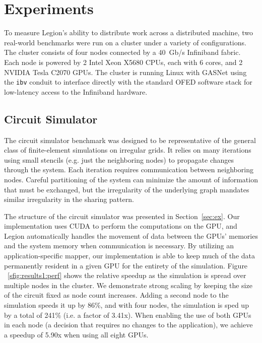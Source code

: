 \section{Experiments}
\label{sec:exp}

To measure Legion's ability to distribute work across a distributed machine, 
two real-world benchmarks were run on a cluster under a
variety of configurations.  The cluster consists of four nodes connected by a
40~Gb/s Infiniband fabric.  Each node is powered by 2 Intel Xeon X5680 CPUs,
each with 6 cores, and 2 NVIDIA Tesla C2070 GPUs.  The cluster is running Linux
with GASNet using the {\tt ibv} conduit to interface directly with the standard
OFED software stack for low-latency access to the Infiniband hardware.


\subsection{Circuit Simulator}

The circuit simulator benchmark was designed to be representative of the
general class of finite-element simulations on irregular grids.  It relies
on many iterations using small stencils (e.g. just the neighboring nodes) to
propagate changes through the system.  Each iteration requires communication
between neighboring nodes.  Careful partitioning of the system can minimize
the amount of information that must be exchanged, but the irregularity of the
underlying graph mandates similar irregularity in the sharing pattern.

The structure of the circuit simulator was presented in Section~\ref{sec:ex}.
Our implementation uses CUDA to perform the computations on the GPU, and Legion
automatically handles the movement of data between the GPUs' memories and the
system memory when communication is necessary.  By utilizing an  
application-specific mapper, our implementation is able to keep much of
the data permanently resident in a given GPU for the entirety of the simulation.
Figure ~\ref{sfig:results1:perf} shows the relative speedup as the simulation is
spread over multiple nodes in the cluster.  We demonstrate strong scaling by
keeping the size of the circuit fixed as node count increases.
Adding a second node to the simulation
speeds it up by 86\%, and with four nodes, the simulation is sped up by a total
of 241\% (i.e. a factor of 3.41x).  When enabling the use of both GPUs in each
node (a decision that requires no changes to the application), we achieve
a speedup of 5.90x when using all eight GPUs.

